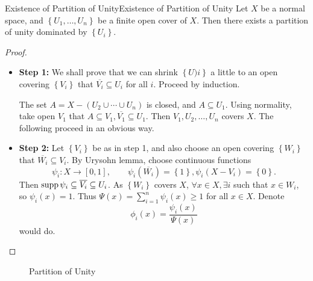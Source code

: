 \documentclass[../main.tex]{subfiles}
\begin{document}
\begin{theorem}{Existence of Partition of Unity}{Existence of Partition of Unity}
	Let $X$ be a normal space, and $\left\{ U_1, \ldots ,U_n \right\}$ be a finite open cover of $X$. Then there exists a partition of unity dominated by $\left\{ U_i \right\}$.
\end{theorem}
\begin{proof}
\begin{itemize}
	\item \textbf{Step 1: } We shall prove that we can shrink $\left\{ U)i \right\}$ a little to an open covering $\left\{ V_i \right\}$ that $\overline{V_i} \subseteq U_i$ for all $i$. Proceed by induction.

		The set $A = X-(U_2\cup \cdots \cup U_n)$ is closed, and $A \subseteq U_1$. Using normality, take open $V_1$ that $A \subseteq V_1,\overline{V_1}\subseteq U_1$. Then $V_1, U_2, \ldots ,U_n$ covers $X$. The following proceed in an obvious way.
	\item \textbf{Step 2:} Let $\left\{ V_i \right\}$ be as in step 1, and also choose an open covering $\left\{ W_i \right\}$ that $\overline{W_i} \subseteq V_i$. By Urysohn lemma, choose continuous functions
		\begin{equation*}
			\psi_i: X \rightarrow [0,1], \qquad \psi_i(\overline{W_i}) = \left\{ 1 \right\}, \psi_i(X-V_i) = \left\{ 0 \right\}.
		\end{equation*}
		Then $\operatorname{supp} \psi_i \subseteq \overline{V_i} \subseteq U_i$. As $\left\{ W_i \right\}$ covers $X$, $\forall x\in X, \exists i$ such that $x\in W_i$, so $\psi_i(x) = 1$. Thus $\Psi(x) = \sum_{i=1}^{n} \psi_i(x) \geq 1$ for all $x\in X$. Denote
		\begin{equation*}
			\phi_i(x) = \frac{\psi_i(x)}{\Psi(x)}
		\end{equation*}
		would do.
\end{itemize}
\end{proof}

\begin{figure}[ht]
    \centering
    \caption{Partition of Unity}
    \label{fig:partition-of-unity}
\end{figure}
\end{document}
